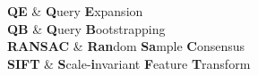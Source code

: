 \cleardoublepage %


{
	\textbf{QE} & \textbf{Q}uery \textbf{E}xpansion \\
	\textbf{QB} & \textbf{Q}uery \textbf{B}ootstrapping \\
	\textbf{RANSAC} & \textbf{Ran}dom \textbf{Sa}mple \textbf{C}onsensus \\
	\textbf{SIFT} & \textbf{S}cale-\textbf{i}nvariant \textbf{F}eature \textbf{T}ransform  \\
}
